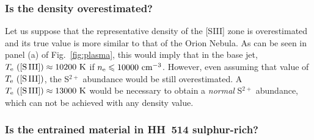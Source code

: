 \documentclass[fleqn,usenatbib]{mnras}
\begin{document}
\subsubsection{Is the density  overestimated?}
\label{subsec:ov_density}

Let us suppose that the representative density of the [S\thinspace III] zone is overestimated and its true value is more similar to that of the Orion Nebula. As can be seen in panel (a) of Fig.~\ref{fig:plasma}, this would imply that in the base jet, $T_{\rm e} \text{ ([S\thinspace III])} \approx 10200 \text{ K}$ if $n_{\rm e} \leq 10000 \text{ cm}^{-3}$. However, even assuming that value of $T_{\rm e} \text{ ([S\thinspace III])}$, the S$^{2+}$ abundance would be still overestimated. A $T_{\rm e} \text{ ([S\thinspace III])} \approx 13000 \text{ K}$ would be necessary to obtain a {\it normal} S$^{2+}$ abundance, which can not be achieved with any density value.

\subsubsection{Is the entrained material in HH~514 sulphur-rich?}
\label{subsec:proplyd}
\end{document}
